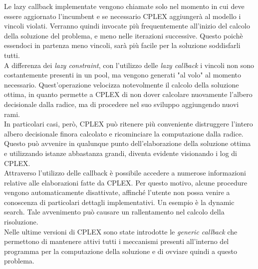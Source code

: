 Le lazy callback implementate vengono chiamate solo nel momento in cui deve essere aggiornato l'incumbent e se necessario CPLEX aggiungerà al modello i vincoli violati. Verranno quindi invocate più frequentemente all'inizio del calcolo della soluzione del problema, e meno nelle iterazioni successive. Questo poichè essendoci in partenza meno vincoli, sarà più facile per la soluzione soddisfarli tutti.\\
A differenza dei \textit{lazy constraint}, con l'utilizzo delle \textit{lazy callback} i vincoli non sono costantemente presenti in un pool, ma vengono generati "al volo" al momento necessario.  Quest'operazione velocizza notevolmente il calcolo della soluzione ottima, in quanto permette a CPLEX di non dover calcolare nuovamente l'albero decisionale dalla radice, ma di procedere nel suo sviluppo aggiungendo nuovi rami.\\
In particolari casi, però, CPLEX può ritenere più conveniente distruggere l'intero albero decisionale finora calcolato e ricominciare la computazione dalla radice. Questo può avvenire in qualunque punto dell'elaborazione della soluzione ottima e utilizzando istanze abbastanza grandi, diventa evidente visionando i log di CPLEX.\\
Attraverso l'utilizzo delle callback è possibile accedere a numerose informazioni relative alle elaborazioni fatte da CPLEX. Per questo motivo, alcune procedure vengono automaticamente disattivate, affinché l'utente non possa venire a conoscenza di particolari dettagli implementativi. Un esempio è la dynamic search. Tale avvenimento può causare un rallentamento nel calcolo della risoluzione.\\
Nelle ultime versioni di CPLEX sono state  introdotte le \textit{generic callback} che permettono di mantenere attivi tutti i meccanismi presenti all'interno del programma per la computazione della soluzione e di ovviare quindi a questo problema.  
